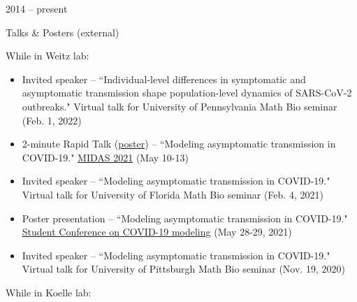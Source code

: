 \documentclass[a4paper,10pt]{article}
\newlength{\cvcolumngapwidth}
\newlength{\cvleftcolumnwidth}
\newlength{\cvrightcolumnwidth}
\newcommand{\cvtitlestyle}[1]{{\large\cvtitlefont\textcolor{cvtitlecolor}{#1}}}
\newcommand{\cvheadingstyle}[1]{{\normalsize\cvheadingfont\textcolor{cvheadingcolor}{#1}}}
\newlength{\cvafteritemskipamount}
\newlength{\cvaftertitleskipamount}
\newlength{\cvparskip}
\newcommand{\cvitem}[2]{
            \begin{minipage}[t]{\cvleftcolumnwidth}
                \raggedleft #1
            \end{minipage}%
            \hspace{\cvcolumngapwidth}%
            \begin{minipage}[t]{\cvrightcolumnwidth}
                \setlength{\parskip}{\cvparskip} #2
            \end{minipage}
        
            \vspace{\cvafteritemskipamount}
        }
\newcommand{\cvtitle}[1]{
            \cvtitlestyle{#1}
        
            \vspace{\cvaftertitleskipamount}
            \vspace{-\cvparskip}
        }
\begin{document}
        \cvitem{
            \cvheadingstyle{2014 -- present}
        }{
        
            \cvtitle{Talks \& Posters (external)}
		While in Weitz lab:
            \begin{itemize}[leftmargin=*]
		\item Invited speaker -- ``Individual-level differences in symptomatic and asymptomatic transmission shape population-level dynamics of SARS-CoV-2 outbreaks." Virtual talk for University of Pennsylvania Math Bio seminar (Feb. 1, 2022)
            	\item 2-minute Rapid Talk (\href{https://github.com/Jeremy-D-Harris/poster_MIDAS2021.git}{poster}) -- ``Modeling asymptomatic transmission in COVID-19."  \href{https://midasnetwork.us/midas-network-annual-meeting-midas-2021/}{\underline{MIDAS 2021}}  (May 10-13) 
                	\item Invited speaker -- ``Modeling asymptomatic transmission in COVID-19." Virtual talk for University of Florida Math Bio seminar (Feb. 4, 2021)
        	\item Poster presentation -- ``Modeling asymptomatic transmission in COVID-19."  \href{https://sites.google.com/view/nsfstudentconference2021/home}{\underline{Student Conference on COVID-19 modeling}}  (May 28-29, 2021)
            	\item Invited speaker -- ``Modeling asymptomatic transmission in COVID-19." Virtual talk for University of Pittsburgh Math Bio seminar (Nov. 19, 2020)
        	    \end{itemize}
        	    	While in Koelle lab:
        	        \begin{itemize}[leftmargin=*] 
        

\end{itemize}}
\end{document}
